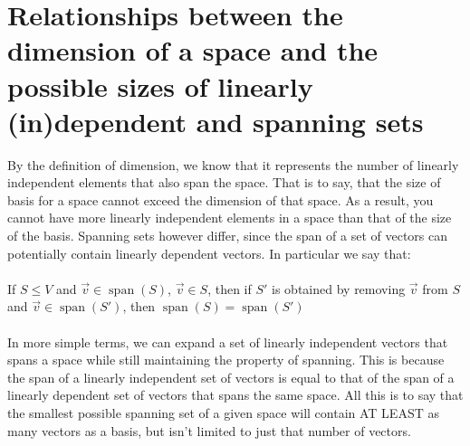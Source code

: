 \documentclass{report}
\begin{document}
\section{Relationships between the dimension of a space and the possible sizes of linearly (in)dependent and spanning sets}
\noindent By the definition of dimension, we know that it represents the number of linearly independent elements that also span the space. That is to say, that the size of basis for a space cannot exceed the dimension of that space. As a result, you cannot have more linearly independent elements in a space than that of the size of the basis. Spanning sets however differ, since the span of a set of vectors can potentially contain linearly dependent vectors. In particular we say that: \\
\\
\noindent If $S\le V$ and $\vec{v}\in\operatorname{span}(S)$, $\vec{v}\in S$, then if $S'$ is obtained by removing $\vec{v}$ from $S$ and $\vec{v}\in\operatorname{span}(S')$, then $\operatorname{span}(S)=\operatorname{span}(S')$ \\
\\
\noindent In more simple terms, we can expand a set of linearly independent vectors that spans a space while still maintaining the property of spanning. This is because the span of a linearly independent set of vectors is equal to that of the span of a linearly dependent set of vectors that spans the same space. All this is to say that the smallest possible spanning set of a given space will contain AT LEAST as many vectors as a basis, but isn't limited to just that number of vectors.
\end{document}
